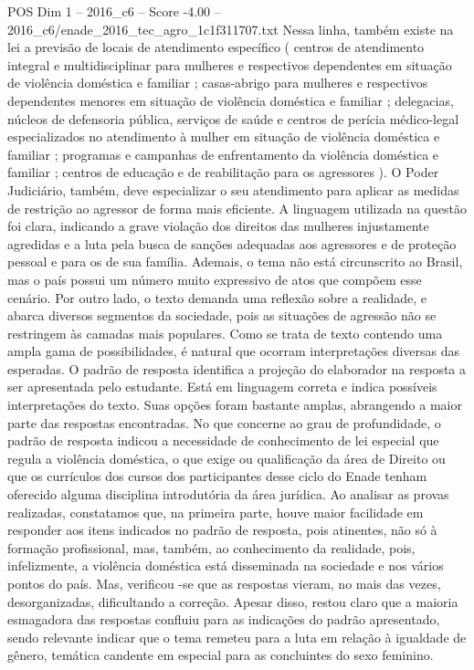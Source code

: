 \begin{textsample}{POS Dim 1 – 2016\_c6 – Score -4.00 – 2016\_c6/enade\_2016\_tec\_agro\_1c1f311707.txt}
Nessa linha, também existe na lei a previsão de locais de atendimento específico ( centros de atendimento integral e multidisciplinar para mulheres e respectivos dependentes em situação de violência doméstica e familiar ; casas-abrigo para mulheres e respectivos dependentes menores em situação de violência doméstica e familiar ; delegacias, núcleos de defensoria pública, serviços de saúde e centros de perícia médico-legal especializados no atendimento à mulher em situação de violência doméstica e familiar ; programas e campanhas de enfrentamento da violência doméstica e familiar ; centros de educação e de reabilitação para os agressores ).
O Poder Judiciário, também, deve especializar o seu atendimento para aplicar as medidas de restrição ao agressor de forma mais eficiente.
A linguagem utilizada na questão foi clara, indicando a grave violação dos direitos das mulheres injustamente agredidas e a luta pela busca de sanções adequadas aos agressores e de proteção pessoal e para os de sua família.
Ademais, o tema não está circunscrito ao Brasil, mas o país possui um número muito expressivo de atos que compõem esse cenário.
Por outro lado, o texto demanda uma reflexão sobre a realidade, e abarca diversos segmentos da sociedade, pois as situações de agressão não se restringem às camadas mais populares.
Como se trata de texto contendo uma ampla gama de possibilidades, é natural que ocorram interpretações diversas das esperadas.
O padrão de resposta identifica a projeção do elaborador na resposta a ser apresentada pelo estudante.
Está em linguagem correta e indica possíveis interpretações do texto.
Suas opções foram bastante amplas, abrangendo a maior parte das respostas encontradas.
No que concerne ao grau de profundidade, o padrão de resposta indicou a necessidade de conhecimento de lei especial que regula a violência doméstica, o que exige ou qualificação da área de Direito ou que os currículos dos cursos dos participantes desse ciclo do Enade tenham oferecido alguma disciplina introdutória da área jurídica.
Ao analisar as provas realizadas, constatamos que, na primeira parte, houve maior facilidade em responder aos itens indicados no padrão de resposta, pois atinentes, não só à formação profissional, mas, também, ao conhecimento da realidade, pois, infelizmente, a violência doméstica está disseminada na sociedade e nos vários pontos do país.
Mas, verificou -se que as respostas vieram, no mais das vezes, desorganizadas, dificultando a correção.
Apesar disso, restou claro que a maioria esmagadora das respostas confluiu para as indicações do padrão apresentado, sendo relevante indicar que o tema remeteu para a luta em relação à igualdade de gênero, temática candente em especial para as concluintes do sexo feminino.

\end{textsample}
